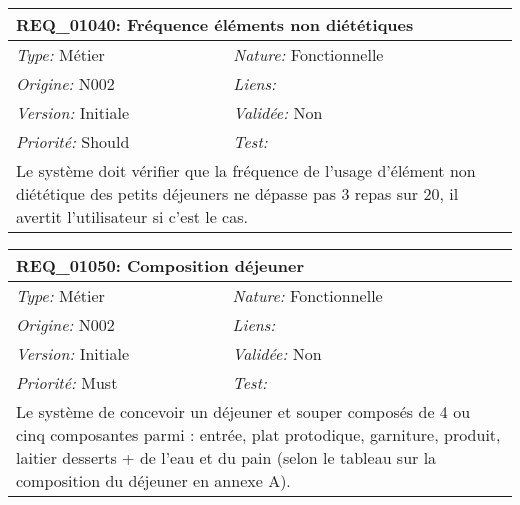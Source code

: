 \begin{table}[!h]

\begin{tabular}{|p{60mm}p{100mm}|}

\hline

\multicolumn{2}{|l|}{\textbf{REQ\_01040:} Fréquence éléments non diététiques} \\ \hline

\emph{Type:} Métier & \emph{Nature:} Fonctionnelle \\

\emph{Origine:} N002 & \emph{Liens:}  \\

\emph{Version:} Initiale & \emph{Validée:} Non \\

\emph{Priorité:} Should & \emph{Test:} \\ \hline

\multicolumn{2}{|p{16cm}|}{Le système doit vérifier que la fréquence de l'usage d'élément non diététique des petits déjeuners ne dépasse pas 3 repas sur 20, il avertit l'utilisateur si c'est le cas.} \\ \hline

\end{tabular}

\end{table}



\begin{table}[!h]

\begin{tabular}{|p{60mm}p{100mm}|}

\hline

\multicolumn{2}{|l|}{\textbf{REQ\_01050:} Composition déjeuner} \\ \hline

\emph{Type:} Métier & \emph{Nature:} Fonctionnelle \\

\emph{Origine:} N002 & \emph{Liens:}  \\

\emph{Version:} Initiale & \emph{Validée:} Non \\

\emph{Priorité:} Must & \emph{Test:} \\ \hline

\multicolumn{2}{|p{16cm}|}{Le système de concevoir un déjeuner et souper composés de 4 ou cinq composantes parmi : entrée, plat protodique, garniture, produit, laitier desserts + de l'eau et du pain (selon le tableau sur la composition du déjeuner en annexe A).} \\ \hline

\end{tabular}

\end{table}



